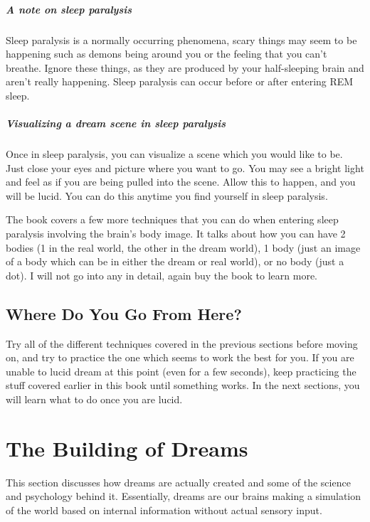 \documentclass{report}
\begin{document}
\paragraph{A note on sleep paralysis} Sleep paralysis is a normally occurring phenomena, scary things may seem to be happening such as demons being around you or the feeling that you can't breathe. Ignore these things, as they are produced by your half-sleeping brain and aren't really happening. Sleep paralysis can occur before or after entering REM sleep.

\paragraph{Visualizing a dream scene in sleep paralysis} Once in sleep paralysis, you can visualize a scene which you would like to be. Just close your eyes and picture where you want to go. You may see a bright light and feel as if you are being pulled into the scene. Allow this to happen, and you will be lucid. You can do this anytime you find yourself in sleep paralysis. 

\bigskip\noindent
The book covers a few more techniques that you can do when entering sleep paralysis involving the brain's body image. It talks about how you can have 2 bodies (1 in the real world, the other in the dream world), 1 body (just an image of a body which can be in either the dream or real world), or no body (just a dot). I will not go into any in detail, again buy the book to learn more. 

\section{Where Do You Go From Here?}
Try all of the different techniques covered in the previous sections before moving on, and try to practice the one which seems to work the best for you. If you are unable to lucid dream at this point (even for a few seconds), keep practicing the stuff covered earlier in this book until something works. In the next sections, you will learn what to do once you are lucid. 


\chapter{The Building of Dreams}
This section discusses how dreams are actually created and some of the science and psychology behind it. Essentially, dreams are our brains making a simulation of the world based on internal information without actual sensory input.
\end{document}
